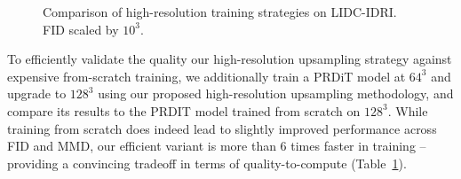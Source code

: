 \begin{figure}
\vspace{-24pt}
\begin{minipage}{0.5\textwidth}
\begin{table}[H]
\caption{Comparison of high-resolution training strategies on LIDC-IDRI. FID scaled by $10^3$.}
\vspace{-6pt}
\centering
{}
\label{tab:highres64}
\end{table}
\end{minipage}
\end{figure}

To efficiently validate the quality our high-resolution upsampling strategy against expensive from-scratch training, we additionally train a PRDiT model at $64^3$ and upgrade to $128^3$ using our proposed high-resolution upsampling methodology, and compare its results to the PRDIT model trained from scratch on $128^3$.  While training from scratch does indeed lead to slightly improved performance across FID and MMD, our efficient variant is more than 6 times faster in training -- providing a convincing tradeoff in terms of quality-to-compute (Table~\ref{tab:highres64}). 


